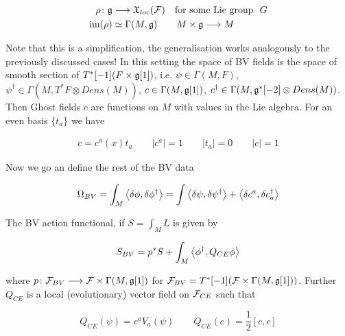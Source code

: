 \begin{align}
  \rho \colon \mathfrak{g} &\longrightarrow \mathfrak{X}_{loc}({\mathcal{F}}) \quad \text{for some Lie group} \ \ G\\
  \operatorname{im}(\rho) &\simeq \Gamma(M, \mathfrak{g}) \quad \quad M \times \mathfrak{g} \longrightarrow M
\end{align}

 Note that this is a simplification, the generalisation works analogously to the previously discussed cases! In this setting the space of BV fields is the space of smooth section of $T^*[-1](F \times \mathfrak{g}[1])$, i.e. $\psi \in \Gamma(M, F)$, $\psi^\dagger \in \Gamma(M, T^*F \otimes Dens(M))$, $c \in \Gamma(M, \mathfrak{g}[1])$, $c^\dagger \in \Gamma(M, \mathfrak{g}^*[-2] \otimes Dens(M))$. Then Ghost fields $c$ are functions on $M$ with values in the Lie algebra. For an even basis $\{t_a\}$ we have

 \begin{align}
   c = c^a (x) t_a \quad \quad |c^a| = 1 \quad \quad |t_a| = 0 \quad \quad |c| = 1
 \end{align}

Now we go an define the rest of the BV data

\begin{equation}
  \Omega_{BV} = \int_M \pair{\delta \phi}{\delta \phi^\dagger} = \int \pair{\delta \psi}{\delta \psi^\dagger} + \pair{\delta c^a}{\delta c^\dagger_a}
\end{equation}

The BV action functional, if $S = \int_M L$ is given by

\begin{equation}
  S_{BV} = p^* S + \int_M \pair{\phi^\dagger}{Q_{CE} \phi}
\end{equation}

where $p \colon {\mathcal{F}}_{BV} \longrightarrow {\mathcal{F}} \times \Gamma(M, \mathfrak{g}[1])$ for ${\mathcal{F}}_{BV} = T^*[-1]({\mathcal{F}} \times \Gamma(M, \mathfrak{g}[1]))$. Further $Q_{CE}$ is a local (evolutionary) vector field on ${\mathcal{F}}_{CE}$ such that

\begin{equation}
  Q_{CE}(\psi) = c^a V_a(\psi) \quad \quad Q_{CE} (c) = \frac{1}{2} [c,c]
\end{equation}

